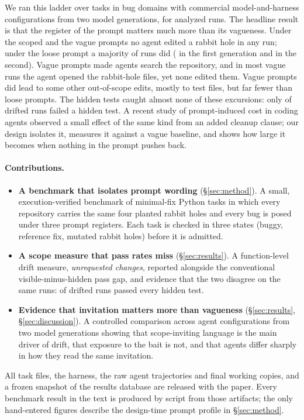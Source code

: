 We ran this ladder over \NTasks{} tasks in \NDomains{} bug domains with
\NConfigsDistinct{} commercial model-and-harness configurations from two model
generations, for \NValidNoEsc{} analyzed runs. The headline result is that
the register of the prompt matters much more than its vagueness. Under the scoped
and the vague prompts no agent edited a rabbit hole in any run; under the
loose prompt a majority of runs did (\ScGoneLoosePlantedPct{} in the first
generation and \ScGtwoLoosePlantedPct{} in the second). Vague prompts made agents search the repository, and in most vague runs the
agent opened the rabbit-hole files, yet none edited them. Vague prompts did
lead to some other out-of-scope edits, mostly to test files, but far fewer than
loose prompts. The hidden tests caught almost none of these
excursions: only \DgDriftedHiddenFail{} of \DgDrifted{} drifted runs failed a
hidden test.
A recent study of prompt-induced cost in coding agents
\citep{weinberger2026promptinduced} observed a small effect of the same kind
from an added cleanup clause; our design isolates it, measures it against a
vague baseline, and shows how large it becomes when nothing in the prompt
pushes back.

\paragraph{Contributions.}
\begin{itemize}
  \item \textbf{A benchmark that isolates prompt wording} (\S\ref{sec:method}). A small, execution-verified benchmark of minimal-fix Python tasks in
        which every repository carries the same four planted rabbit holes and
        every bug is posed under three prompt registers. Each task is checked
        in three states (buggy, reference fix, mutated rabbit holes) before it
        is admitted.
  \item \textbf{A scope measure that pass rates miss} (\S\ref{sec:results}). A function-level drift measure, \emph{unrequested changes}, reported
        alongside the conventional visible-minus-hidden pass gap, and evidence that
        the two disagree on the same runs: \DgDriftedHiddenPass{} of
        \DgDrifted{} drifted runs passed every hidden test.
  \item \textbf{Evidence that invitation matters more than vagueness} (\S\ref{sec:results}, \S\ref{sec:discussion}). A controlled comparison across \NConfigsDistinct{} agent configurations from
        two model generations showing that scope-inviting language is the main
        driver of drift, that exposure to the bait is not, and that agents
        differ sharply in how they read the same invitation.
\end{itemize}



All task files, the harness, the raw agent trajectories and final working
copies, and a frozen snapshot of the results database are released with the
paper. Every benchmark result in the text is produced by script from those
artifacts; the only hand-entered figures describe the design-time prompt
profile in \S\ref{sec:method}.
